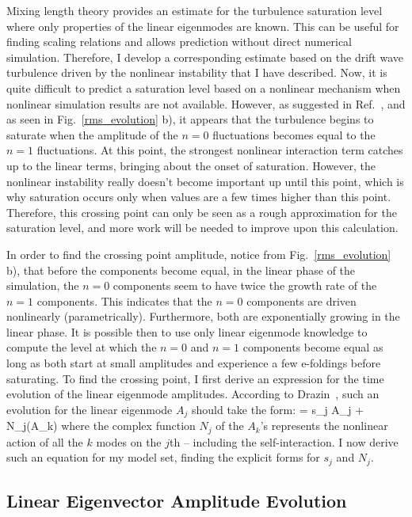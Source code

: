 Mixing length theory provides an estimate for the turbulence saturation level where only properties of the linear eigenmodes are known. This can be useful for finding scaling relations and allows
prediction without direct numerical simulation. Therefore, I develop a corresponding estimate based on the drift wave turbulence driven by the nonlinear instability that I have described.
Now, it is quite difficult to predict a saturation level based on a nonlinear mechanism when nonlinear simulation results are not available. However, as suggested in Ref.~\cite{cheng1979},
and as seen in Fig.~\ref{rms_evolution} b), it appears that the turbulence begins to saturate when the amplitude of the $n=0$ fluctuations becomes equal to the $n=1$ fluctuations.
At this point, the strongest nonlinear interaction term catches up to the linear terms, bringing about the onset of saturation. However, the nonlinear instability really doesn't become important
up until this point, which is why saturation occurs only when values are a few times higher than this point. Therefore, this crossing point can only be seen as a rough approximation for the
saturation level, and more work will be needed to improve upon this calculation.

In order to find the crossing point amplitude, notice from Fig.~\ref{rms_evolution} b), that before the components become equal, in the linear phase of the simulation,
the $n=0$ components seem to have twice the growth rate of the $n=1$ components. This indicates that the
$n=0$ components are driven nonlinearly (parametrically). Furthermore, both are exponentially growing in the linear phase. It is possible then to use only linear eigenmode knowledge
to compute the level at which the $n=0$ and $n=1$ components become equal as long as both start at small amplitudes and experience a few e-foldings before saturating. To find the crossing
point, I first derive an expression for the time evolution of the linear eigenmode amplitudes. According to Drazin~\cite{drazin1981}, such an evolution for the linear eigenmode $A_j$
should take the form:
\beq
\label{drazin_form}
 =  s_j A_j + N_j(A_k)
\eeq
where the complex function $N_j$ of the $A_k$'s represents the nonlinear action of all the $k$ modes on the $j$th -- including the self-interaction. I now derive such an equation for my model
set, finding the explicit forms for $s_j$ and $N_j$.

\subsection{Linear Eigenvector Amplitude Evolution}
\label{ss_eigenmode_ev}

